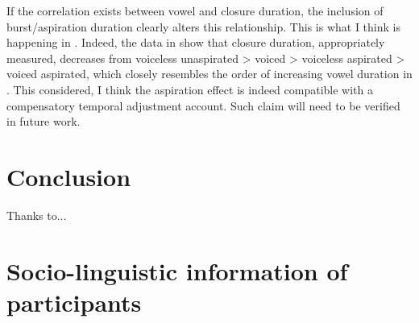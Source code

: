 \documentclass[preprint]{JASAnew}
\begin{document}
If the correlation exists between vowel and closure duration, the
inclusion of burst/aspiration duration clearly alters this relationship.
This is what I think is happening in \citet{maddieson1976}. Indeed, the
data in \citet{durvasula2012} show that closure duration, appropriately
measured, decreases from voiceless unaspirated \textgreater{} voiced
\textgreater{} voiceless aspirated \textgreater{} voiced aspirated,
which closely resembles the order of increasing vowel duration in
\citet{maddieson1976}. This considered, I think the aspiration effect is
indeed compatible with a compensatory temporal adjustment account. Such
claim will need to be verified in future work.

\hypertarget{conclusion}{%
\section{Conclusion}\label{conclusion}}

\begin{acknowledgments}
Thanks to...
\end{acknowledgments}

\appendix

\section{Socio-linguistic information of participants}
\label{a:socioling}
\end{document}
